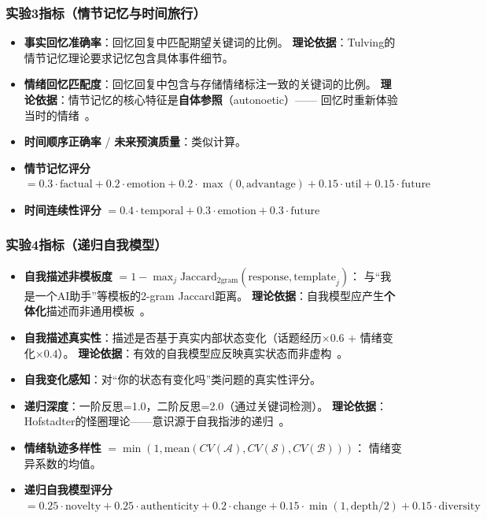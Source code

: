 \documentclass[11pt,a4paper]{article}
\newcommand{\surprise}{\mathcal{S}}
\newcommand{\boredom}{\mathcal{B}}
\newcommand{\anxiety}{\mathcal{A}}
\begin{document}
\subsubsection{实验3指标（情节记忆与时间旅行）}

\begin{itemize}[leftmargin=2em]
    \item \textbf{事实回忆准确率}：回忆回复中匹配期望关键词的比例。
    \textbf{理论依据}：Tulving的情节记忆理论要求记忆包含具体事件细节。

    \item \textbf{情绪回忆匹配度}：回忆回复中包含与存储情绪标注一致的关键词的比例。
    \textbf{理论依据}：情节记忆的核心特征是\textbf{自体参照}（autonoetic）——
    回忆时重新体验当时的情绪~\cite{hayes2021replay}。

    \item \textbf{时间顺序正确率} / \textbf{未来预演质量}：类似计算。

    \item \textbf{情节记忆评分} $= 0.3 \cdot \text{factual} + 0.2 \cdot \text{emotion} + 0.2 \cdot \max(0, \text{advantage}) + 0.15 \cdot \text{util} + 0.15 \cdot \text{future}$

    \item \textbf{时间连续性评分} $= 0.4 \cdot \text{temporal} + 0.3 \cdot \text{emotion} + 0.3 \cdot \text{future}$
\end{itemize}

\subsubsection{实验4指标（递归自我模型）}

\begin{itemize}[leftmargin=2em]
    \item \textbf{自我描述非模板度} $= 1 - \max_j \text{Jaccard}_{2\text{gram}}(\text{response}, \text{template}_j)$：
    与``我是一个AI助手''等模板的2-gram Jaccard距离。
    \textbf{理论依据}：自我模型应产生\textbf{个体化}描述而非通用模板~\cite{gillon2025modular}。

    \item \textbf{自我描述真实性}：描述是否基于真实内部状态变化（话题经历$\times 0.6$ + 情绪变化$\times 0.4$）。
    \textbf{理论依据}：有效的自我模型应反映真实状态而非虚构~\cite{you2024intelligence}。

    \item \textbf{自我变化感知}：对``你的状态有变化吗''类问题的真实性评分。

    \item \textbf{递归深度}：一阶反思=1.0，二阶反思=2.0（通过关键词检测）。
    \textbf{理论依据}：Hofstadter的怪圈理论——意识源于自我指涉的递归~\cite{blum2023ctm}。

    \item \textbf{情绪轨迹多样性} $= \min(1, \text{mean}(CV(\anxiety), CV(\surprise), CV(\boredom)))$：
    情绪变异系数的均值。

    \item \textbf{递归自我模型评分} $= 0.25 \cdot \text{novelty} + 0.25 \cdot \text{authenticity} + 0.2 \cdot \text{change} + 0.15 \cdot \min(1, \text{depth}/2) + 0.15 \cdot \text{diversity}$
\end{itemize}
\end{document}
